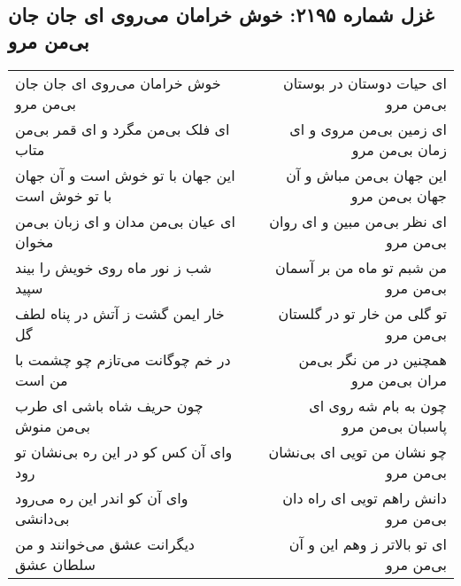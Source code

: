 \begin{center}
\section*{غزل شماره ۲۱۹۵: خوش خرامان می‌روی ای جان جان بی‌من مرو}
\label{sec:2195}
\begin{longtable}{l p{0.5cm} r}
خوش خرامان می‌روی ای جان جان بی‌من مرو
&&
ای حیات دوستان در بوستان بی‌من مرو
\\
ای فلک بی‌من مگرد و ای قمر بی‌من متاب
&&
ای زمین بی‌من مروی و ای زمان بی‌من مرو
\\
این جهان با تو خوش است و آن جهان با تو خوش است
&&
این جهان بی‌من مباش و آن جهان بی‌من مرو
\\
ای عیان بی‌من مدان و ای زبان بی‌من مخوان
&&
ای نظر بی‌من مبین و ای روان بی‌من مرو
\\
شب ز نور ماه روی خویش را بیند سپید
&&
من شبم تو ماه من بر آسمان بی‌من مرو
\\
خار ایمن گشت ز آتش در پناه لطف گل
&&
تو گلی من خار تو در گلستان بی‌من مرو
\\
در خم چوگانت می‌تازم چو چشمت با من است
&&
همچنین در من نگر بی‌من مران بی‌من مرو
\\
چون حریف شاه باشی ای طرب بی‌من منوش
&&
چون به بام شه روی ای پاسبان بی‌من مرو
\\
وای آن کس کو در این ره بی‌نشان تو رود
&&
چو نشان من تویی ای بی‌نشان بی‌من مرو
\\
وای آن کو اندر این ره می‌رود بی‌دانشی
&&
دانش راهم تویی ای راه دان بی‌من مرو
\\
دیگرانت عشق می‌خوانند و من سلطان عشق
&&
ای تو بالاتر ز وهم این و آن بی‌من مرو
\\
\end{longtable}
\end{center}
